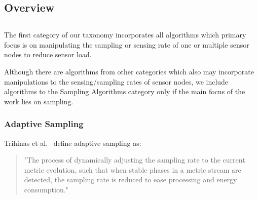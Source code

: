\subsection{Overview}
\label{sec:Overview}


\subsection{\catI} %
\label{sec:catI}

The first category of our taxonomy incorporates all algorithms which primary 
focus is on manipulating the sampling or sensing rate of one or multiple sensor
nodes to reduce sensor load.
 
Although there are algorithms from other categories which also may incorporate
manipulations to the sensing/sampling rates of sensor nodes, we include
algorithms to the Sampling Algorithms category only if the main focus of the
work lies on sampling.


\subsubsection{Adaptive Sampling}
\label{sec:Adaptive Sampling}

Trihinas et al.~\cite{trihinas2015adam} define adaptive sampling as:

\begin{quote}
    "The process of dynamically adjusting the sampling rate to the current
    metric evolution, such that when stable phases in a metric stream are detected,
    the sampling rate is reduced to ease processing and energy consumption."
\end{quote}

